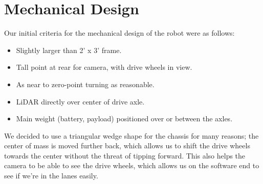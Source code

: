 \section{Mechanical Design}

Our initial criteria for the mechanical design of the robot were as follows:
\begin{itemize}
    \item Slightly larger than 2' x 3' frame.
    \item Tall point at rear for camera, with drive wheels in view.
    \item As near to zero-point turning as reasonable.
    \item LiDAR directly over center of drive axle.
    \item Main weight (battery, payload) positioned over or between the axles.
\end{itemize}

We decided to use a triangular wedge shape for the chassis for many reasons; the center of mass is moved further back, which allows us to shift the drive wheels towards the center without the threat of tipping forward. This also helps the camera to be able to see the drive wheels, which allows us on the software end to see if we're in the lanes easily.


